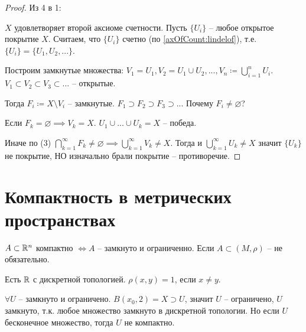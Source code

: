 \documentclass[main]{subfiles}
\begin{document}
\begin{proof}
    Из 4 в 1:

    $X$ удовлетворяет второй аксиоме счетности.
    Пусть $\{U_i\}$  -- любое открытое покрытие $X$.
    Считаем, что $\{U_i\}$ счетно (по \ref{axOfCount:lindelof}), т.е. $\{U_i\} = \{U_1, U_2, ...\}$.

    Построим замкнутые множества:
    $V_1 = U_1, V_2 = U_1 \cup U_2, ..., V_n \coloneqq \bigcup_{i=1}^n U_i$.
    $V_1 \subset V_2 \subset V_3 \subset ...$ -- открытые.

    Тогда $F_i \coloneqq X \setminus V_i$ -- замкнутые.
    $F_1 \supset F_2 \supset F_3 \supset ...$
    Почему $F_i \neq \varnothing$?

    Если $F_k = \varnothing \implies V_k = X$.
    $U_1 \cup ... \cup U_k = X$ -- победа.

    Иначе по (3) $\bigcap_{k=1}^\infty F_k \neq \varnothing \implies \bigcup_{k=1}^\infty V_k \neq X$.
    Тогда и $\bigcup_{k=1}^\infty U_k \neq X$ значит $\{U_k\}$ не покрытие,
    НО изначально брали покрытие -- противоречие.
\end{proof}

\section{Компактность в метрических пространствах}
\begin{remark}
    $A \subset \mathbb{R}^n$ компактно $\Leftrightarrow A$ -- замкнуто и ограниченно.
    Если $A \subset (M, \rho)$ -- не обязательно.
\end{remark}
\begin{example}
    Есть $\mathbb{R}$ с дискретной топологией. $\rho(x,y) = 1$, если $x \neq y$.

    $\forall U$ -- замкнуто и ограничено. $B(x_0, 2) = X \supset U$, значит $U$ -- ограничено,
    $U$ замкнуто, т.к. любое множество замкнуто в дискретной топологии.
    Но если $U$ бесконечное множество, тогда $U$ не компактно.
\end{example}
\end{document}
